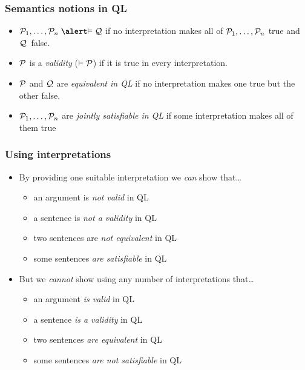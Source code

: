 \begin{frame}
\frametitle{Semantics notions in QL}


\begin{itemize}[<+->]
  \item $\metav{P}_1,\dots,\metav{P}_n \mathrel{\emph{\entails}} \metav{Q}$ if no interpretation
  makes all of $\mathcal{P}_1,\dots,\mathcal{P}_n$ true and $\mathcal{Q}$~false.
  \item $\mathcal{P}$ is a \emph{validity} ($\vDash \mathcal{P}$) if it is true in every interpretation.
  \item $\mathcal{P}$ and $\mathcal{Q}$ are \emph{equivalent in QL} if no
 interpretation makes one true but the other false.
 \item $\mathcal{P}_1,\dots,\mathcal{P}_n$ are \emph{jointly satisfiable
 in QL} if some interpretation makes all of them true %
\end{itemize}
\end{frame}

\begin{frame}
\frametitle{Using interpretations}

\begin{itemize}[<+->]
\item By providing one suitable interpretation we \emph{can} show that\dots
\begin{itemize}[<+->]
  \item an argument is \emph{not valid} in QL
  \item a sentence is \emph{not a validity} in QL
  \item two sentences are \emph{not equivalent} in QL
  \item some sentences \emph{are satisfiable} in QL
\end{itemize}
\item But we \emph{cannot} show using any number of interpretations that\dots
\begin{itemize}[<+->]
  \item an argument \emph{is valid} in QL
  \item a sentence \emph{is a validity} in QL
  \item two sentences \emph{are equivalent} in QL
  \item some sentences \emph{are not satisfiable} in QL
\end{itemize}
\end{itemize}
\end{frame}

